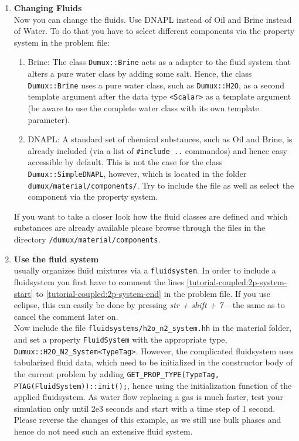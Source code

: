 \begin{enumerate}
\item \textbf{Changing Fluids} \\
Now you can change the fluids. Use DNAPL instead of Oil and Brine instead of Water. To do that you have to select different components via the property system in the problem file:
\begin{enumerate}
 \item Brine: The class \texttt{Dumux::Brine} acts as a adapter to the fluid system that alters a pure water class by adding some salt. Hence, the class \texttt{Dumux::Brine} uses a pure water class, such as \texttt{Dumux::H2O}, as a second template argument after the data type \texttt{<Scalar>} as a template argument (be aware to use the complete water class with its own template parameter).
 \item DNAPL: A standard set of chemical substances, such as Oil and Brine, is already included (via a list of \texttt{\#include ..} commandos) and hence easy accessible by default. This is not the case for the class \texttt{Dumux::SimpleDNAPL}, however, which is located in the folder \texttt{dumux/material/components/}. Try to include the file as well as select the component via the property system.
\end{enumerate}
If you want to take a closer look how the fluid classes are defined and which substances are already available please browse through the files in the directory
\texttt{/dumux/material/components}.

\item \textbf{Use the \Dumux fluid system} \\
\Dumux usually organizes fluid mixtures via a \texttt{fluidsystem}. In order to include a fluidsystem you first have to comment the lines \ref{tutorial-coupled:2p-system-start} to \ref{tutorial-coupled:2p-system-end} in the problem file. If you use eclipse, this can easily be done by pressing \textit{str + shift + 7} -- the same as to cancel the comment later on.\\
Now include the file \texttt{fluidsystems/h2o\_n2\_system.hh} in the material folder, and set a property \texttt{FluidSystem} with the appropriate type, \texttt{Dumux::H2O\_N2\_System<TypeTag>}. However, the complicated fluidsystem uses tabularized fluid data, which need to be initialized in the constructor body of the current problem by adding \texttt{GET\_PROP\_TYPE(TypeTag, PTAG(FluidSystem))::init();}, hence using the initialization function of the applied fluidsystem. As water flow replacing a gas is much faster, test your simulation only until 2e3 seconds and start with a time step of 1 second.\\
Please reverse the changes of this example, as we still use bulk phases and hence do not need such an extensive fluid system.


\end{enumerate}
